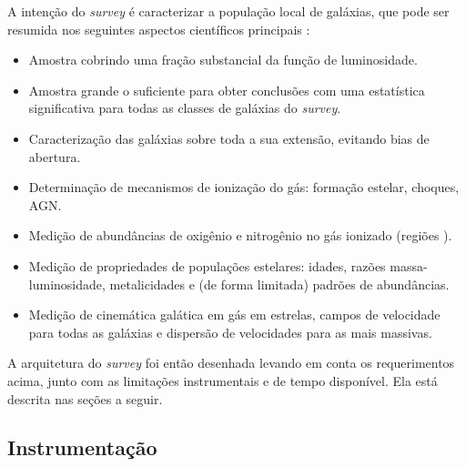 A intenção do {\em survey} é caracterizar a população local de galáxias, que
pode ser resumida nos seguintes aspectos científicos principais
\citep{Sanchez2012}:
\begin{itemize}
  \item Amostra cobrindo uma fração substancial da função de luminosidade.
  \item Amostra grande o suficiente para obter conclusões com uma estatística
  significativa para todas as classes de galáxias do {\em survey}.
  \item Caracterização das galáxias sobre toda a sua extensão, evitando bias de
  abertura.
  \item Determinação de mecanismos de ionização do gás: formação estelar,
  choques, AGN.
  \item Medição de abundâncias de oxigênio e nitrogênio no gás ionizado (regiões
  \HII).
  \item Medição de propriedades de populações estelares: idades, razões
  massa-luminosidade, metalicidades e (de forma limitada) padrões de
  abundâncias.
  \item Medição de cinemática galática em gás em estrelas, campos de velocidade
  para todas as galáxias e dispersão de velocidades para as mais massivas.
\end{itemize}
A arquitetura do {\em survey} foi então desenhada levando em conta os
requerimentos acima, junto com as limitações instrumentais e de tempo
disponível. Ela está descrita nas seções a seguir.

\subsection{Instrumentação}
\label{sec:ifs:instrumentacao}



